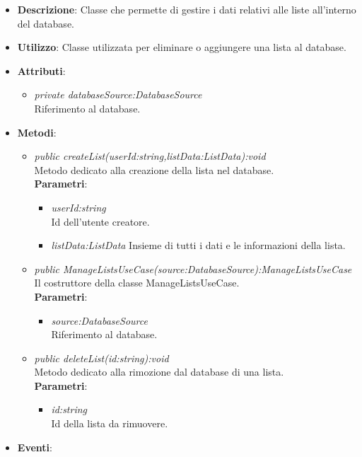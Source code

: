 \begin{itemize}
\item \textbf{Descrizione}: Classe che permette di gestire i dati relativi alle liste all'interno del database.
\item \textbf{Utilizzo}: Classe utilizzata per eliminare o aggiungere una lista al database.
\item \textbf{Attributi}: 
	\begin{itemize}
	\item \textit{private databaseSource:DatabaseSource}\\
		Riferimento al database.
	\end{itemize}
\item \textbf{Metodi}:
	\begin{itemize}
	\item \textit{public createList(userId:string,listData:ListData):void}\\
		Metodo dedicato alla creazione della lista nel database.
			\\ \textbf{Parametri}: \begin{itemize}
			\item \textit{userId:string}\\
			Id dell'utente creatore.
			\item \textit{listData:ListData}
			Insieme di tutti i dati e le informazioni della lista.
			\end{itemize} 
	\item \textit{public ManageListsUseCase(source:DatabaseSource):ManageListsUseCase}\\
	Il costruttore della classe ManageListsUseCase.
		\\ \textbf{Parametri}: \begin{itemize}
			\item \textit{source:DatabaseSource}\\
						Riferimento al database.
			\end{itemize} 
	\item \textit{public deleteList(id:string):void}\\
	Metodo dedicato alla rimozione dal database di una lista.
			\\ \textbf{Parametri}: \begin{itemize}
			\item \textit{id:string}\\
			Id della lista da rimuovere.
			\end{itemize} 
	\end{itemize}
\item \textbf{Eventi}:
\end{itemize}

